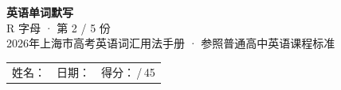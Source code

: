 \documentclass[10pt,a4paper]{article}
\begin{document}
\pagestyle{plain}

\begin{center}
{\LARGE\bfseries 英语单词默写}\\[0.22em]
{\large R 字母 · 第 2 / 5 份}\\[0.18em]
{\small 2026年上海市高考英语词汇用法手册 · 参照普通高中英语课程标准}
\end{center}

\vspace{0.25em}
\noindent\begin{tabular}{@{}p{}@{}p{}@{}p{}@{}}
姓名：\underline{\hspace{2.0cm}} & 日期：\underline{\hspace{2.0cm}} & 得分：\underline{\hspace{1.3cm}}\,/\,45 \\
\end{tabular}

\vspace{0.3em}

\vspace{0.08em}
\end{document}
